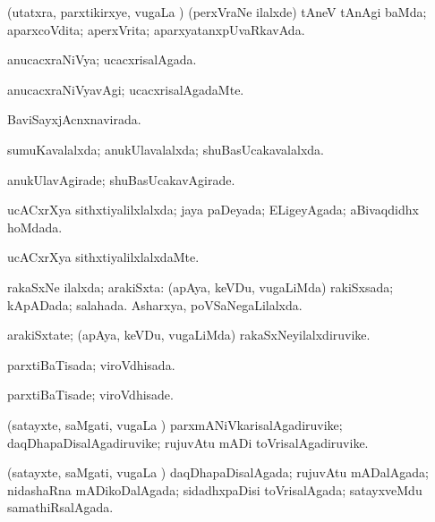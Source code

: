 \bentry
{} 
\gl{\gu}
\expl{}
\bmng
(utatxra, parxtikirxye, \mo vugaLa \vi) (perxVraNe ilalxde) tAneV tAnAgi baMda; aparxcoVdita; aperxVrita; aparxyatanxpUvaRkavAda. 
\emng
\eentry

\bentry
{} 
\gl{\gu}
\expl{}
\bmng
anucacxraNiVya; ucacxrisalAgada. 
\emng
\eentry

\bentry
{} 
\gl{\kirxvi}
\expl{}
\bmng
anucacxraNiVyavAgi; ucacxrisalAgadaMte. 
\emng
\eentry

\bentry
{} 
\gl{\gu}
\expl{}
\bmng
BaviSayxjAcnxnavirada. 
\emng
\eentry

\bentry
{} 
\gl{\gu}
\expl{}
\bmng
sumuKavalalxda; anukUlavalalxda; shuBasUcakavalalxda. 
\emng
\eentry

\bentry
{} 
\gl{\kirxvi}
\expl{}
\bmng
anukUlavAgirade; shuBasUcakavAgirade. 
\emng
\eentry

\bentry
{} 
\gl{\gu}
\expl{}
\bmng
ucACxrXya sithxtiyalilxlalxda; jaya paDeyada; ELigeyAgada; aBivaqdidhx hoMdada. 
\emng
\eentry

\bentry
{} 
\gl{\kirxvi}
\expl{}
\bmng
ucACxrXya sithxtiyalilxlalxdaMte. 
\emng
\eentry

\bentry
{} 
\gl{\gu}
\expl{}
\bmng
rakaSxNe ilalxda; arakiSxta: 
\banum
{} (apAya, keVDu, \mo vugaLiMda) rakiSxsada; kApADada; salahada. 
 Asharxya, poVSaNegaLilalxda. 
\eanum
\emng
\eentry

\bentry
{} 
\gl{\nA}
\expl{}
\bmng
arakiSxtate; (apAya, keVDu, \mo vugaLiMda) rakaSxNeyilalxdiruvike. 
\emng
\eentry

\bentry
{} 
\gl{\gu}
\expl{}
\bmng
parxtiBaTisada; viroVdhisada. 
\emng
\eentry

\bentry
{} 
\gl{\kirxvi}
\expl{}
\bmng
parxtiBaTisade; viroVdhisade. 
\emng
\eentry

\bentry
{} 
\gl{\nA}
\expl{}
\bmng
(satayxte, saMgati, \mo vugaLa \vi) parxmANiVkarisalAgadiruvike; daqDhapaDisalAgadiruvike; rujuvAtu mADi toVrisalAgadiruvike. 
\emng
\eentry

\bentry
{} 
\gl{\gu}
\expl{}
\bmng
(satayxte, saMgati, \mo vugaLa \vi) daqDhapaDisalAgada; rujuvAtu mADalAgada; nidashaRna mADikoDalAgada; sidadhxpaDisi toVrisalAgada; satayxveMdu samathiRsalAgada. 
\emng
\eentry

